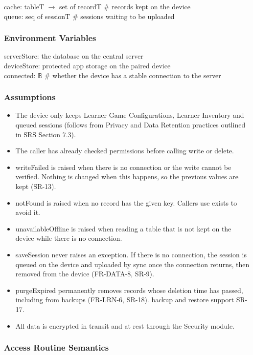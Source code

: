 \documentclass[12pt, titlepage]{article}
\begin{document}
cache: tableT $\rightarrow$ set of recordT \# records kept on the device \\
queue: seq of sessionT \# sessions waiting to be uploaded

\subsubsection{Environment Variables}

serverStore: the database on the central server \\
deviceStore: protected app storage on the paired device \\
connected: $\mathbb{B}$ \# whether the device has a stable connection to the
server

\subsubsection{Assumptions}

\begin{itemize}
\item The device only keeps Learner Game Configurations, Learner Inventory and
  queued sessions (follows from Privacy and Data Retention practices outlined in SRS Section 7.3).
\item The caller has already checked permissions before calling write or delete.
\item writeFailed is raised when there is no connection or the write cannot be
  verified. Nothing is changed when this happens, so the previous values are
  kept (SR-13).
\item notFound is raised when no record has the given key. Callers use exists to
  avoid it.
\item unavailableOffline is raised when reading a table that is not kept on the
  device while there is no connection.
\item saveSession never raises an exception. If there is no connection, the
  session is queued on the device and uploaded by sync once the connection
  returns, then removed from the device (FR-DATA-8, SR-9).
\item purgeExpired permanently removes records whose deletion time has passed,
  including from backups (FR-LRN-6, SR-18). backup and restore support SR-17.
\item All data is encrypted in transit and at rest through the Security module.
\end{itemize}

\subsubsection{Access Routine Semantics}
\end{document}

